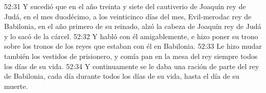 52:31 Y sucedió que en el año treinta y siete del cautiverio de Joaquín rey de Judá, en el mes duodécimo, a los veinticinco días del mes, Evil-merodac rey de Babilonia, en el año primero de su reinado, alzó la cabeza de Joaquín rey de Judá y lo sacó de la cárcel. 
52:32 Y habló con él amigablemente, e hizo poner su trono sobre los tronos de los reyes que estaban con él en Babilonia. 
52:33 Le hizo mudar también los vestidos de prisionero, y comía pan en la mesa del rey siempre todos los días de su vida. 
52:34 Y continuamente se le daba una ración de parte del rey de Babilonia, cada día durante todos los días de su vida, hasta el día de su muerte.